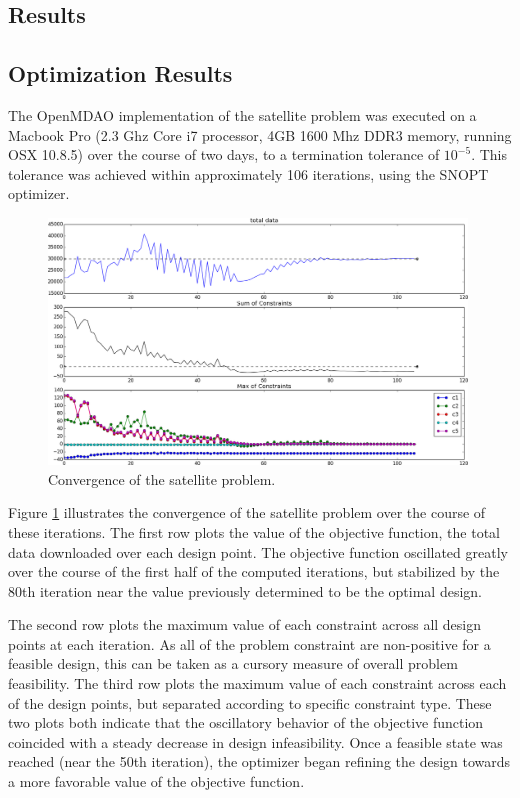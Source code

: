 \documentclass[]{aiaa-tc} %
\begin{document}
    \subsection{Results}

        \subsection{Optimization Results}

        The OpenMDAO implementation of the satellite problem was executed on a
        Macbook Pro (2.3 Ghz Core i7 processor, 4GB 1600 Mhz DDR3 memory, running OSX 10.8.5)
        over the course of two days, to a termination tolerance of $10^{-5}$. This tolerance
        was achieved within approximately 106 iterations, using the SNOPT\cite{gill2005snopt}
        optimizer.

        \begin{figure}
        \centering
        \includegraphics[width=0.99\textwidth]{images/opt}
        \caption[width=0.22\textwidth]{Convergence of the satellite problem.
        \label{convergence}
        }
        \end{figure}


        Figure \ref{convergence} illustrates the convergence of the satellite problem over the course of
        these iterations. The first row plots the
        value of the objective function, the total data downloaded over each design point. The objective
        function oscillated greatly over the course of the first half of the computed iterations, but
        stabilized by the 80th iteration near the value previously determined \cite{CADRE2012}
        to be the optimal design.

        The second row plots the maximum value of each constraint across all design points at
        each iteration. As all of the problem constraint are non-positive for a feasible design,
        this can be taken as a cursory measure of overall problem feasibility.
        The third row plots the maximum value of each constraint across each of the design points,
        but separated according to specific constraint type. These two plots both indicate that the
        oscillatory behavior of the objective function coincided with a steady decrease in design
        infeasibility. Once a feasible state was reached (near the 50th iteration), the optimizer
        began refining the design towards a more favorable value of the objective function.
\end{document}
